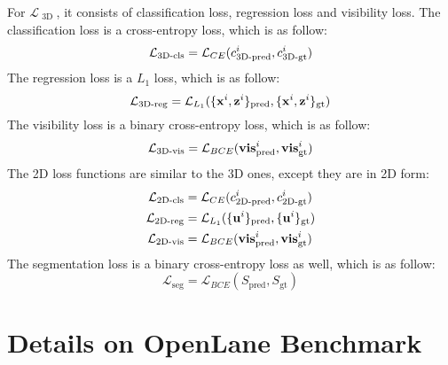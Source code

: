 \documentclass[runningheads]{llncs}
\begin{document}
For $\mathcal{L}_{ \text{  3D } }$, it consists of classification loss, regression loss and visibility loss.
The classification loss is a cross-entropy loss, which is as follow:
\begin{equation}
    \mathcal{L}_{\text{3D}{\text -}\text{cls}} = \mathcal{L}_{CE}(c^i_{\text{3D}{\text -}\text{pred}}, c^i_{\text{3D}{\text -}\text{gt}})
\end{equation}
The regression loss is a $L_1$ loss, which is as follow:
\begin{equation}
    \mathcal{L}_{\text{3D}{\text -}\text{reg}} = \mathcal{L}_{L_1}(\{\mathbf{x}^i, \mathbf{z}^i\}_{\text{pred}}, \{\mathbf{x}^i, \mathbf{z}^i\}_{\text{gt}})
\end{equation}
The visibility loss is a binary cross-entropy loss, which is as follow:
\begin{equation}
    \mathcal{L}_{\text{3D}{\text -}\text{vis}} = \mathcal{L}_{BCE}(\mathbf{vis}^i_{\text{pred}}, \mathbf{vis}^i_{\text{gt}})
\end{equation}
The 2D loss functions are similar to the 3D ones, except they are in 2D form:
\begin{equation}
    \begin{split}
        \mathcal{L}_{\text{2D}{\text -}\text{cls}} &= \mathcal{L}_{CE}(c^i_{\text{2D}{\text -}\text{pred}}, c^i_{\text{2D}{\text -}\text{gt}}) \\
        \mathcal{L}_{\text{2D}{\text -}\text{reg}} &= \mathcal{L}_{L_1}(\{\mathbf{u}^i \}_{\text{pred}}, \{\mathbf{u}^i\}_{\text{gt}}) \\
        \mathcal{L}_{\text{2D}{\text -}\text{vis}} & = \mathcal{L}_{BCE}(\mathbf{vis}^i_{\text{pred}}, \mathbf{vis}^i_{\text{gt}})
    \end{split}
\end{equation}
The segmentation loss is a binary cross-entropy loss as well, which is as follow:
\begin{equation}
    \mathcal{L}_{\text{seg}} = \mathcal{L}_{BCE}(S_{\text{pred}}, S_{\text{gt}})
\end{equation}









\section{Details on OpenLane Benchmark}\label{sec: sup - dataset}
\end{document}
